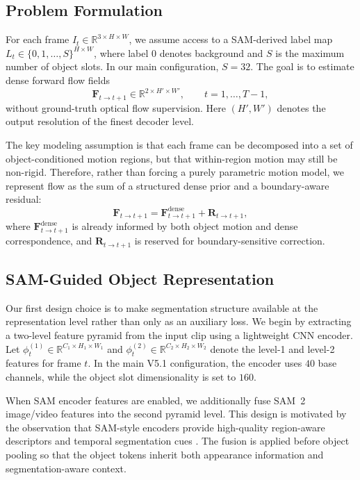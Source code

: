 \subsection{Problem Formulation}

For each frame $I_t \in \mathbb{R}^{3\times H\times W}$, we assume access to a SAM-derived label map $L_t \in \{0,1,\dots,S\}^{H\times W}$, where label $0$ denotes background and $S$ is the maximum number of object slots. In our main configuration, $S=32$. The goal is to estimate dense forward flow fields
\begin{equation}
\mathbf{F}_{t\rightarrow t+1} \in \mathbb{R}^{2\times H'\times W'}, \qquad t=1,\dots,T-1,
\end{equation}
without ground-truth optical flow supervision. Here $(H',W')$ denotes the output resolution of the finest decoder level.

The key modeling assumption is that each frame can be decomposed into a set of object-conditioned motion regions, but that within-region motion may still be non-rigid. Therefore, rather than forcing a purely parametric motion model, we represent flow as the sum of a structured dense prior and a boundary-aware residual:
\begin{equation}
\label{eq:flow_decomposition}
\mathbf{F}_{t\rightarrow t+1} = \mathbf{F}^{\mathrm{dense}}_{t\rightarrow t+1} + \mathbf{R}_{t\rightarrow t+1},
\end{equation}
where $\mathbf{F}^{\mathrm{dense}}_{t\rightarrow t+1}$ is already informed by both object motion and dense correspondence, and $\mathbf{R}_{t\rightarrow t+1}$ is reserved for boundary-sensitive correction.

\subsection{SAM-Guided Object Representation}

Our first design choice is to make segmentation structure available at the representation level rather than only as an auxiliary loss. We begin by extracting a two-level feature pyramid from the input clip using a lightweight CNN encoder. Let $\phi_t^{(1)} \in \mathbb{R}^{C_1\times H_1\times W_1}$ and $\phi_t^{(2)} \in \mathbb{R}^{C_2\times H_2\times W_2}$ denote the level-1 and level-2 features for frame $t$. In the main V5.1 configuration, the encoder uses $40$ base channels, while the object slot dimensionality is set to $160$.

When SAM encoder features are enabled, we additionally fuse SAM~2 image/video features into the second pyramid level. This design is motivated by the observation that SAM-style encoders provide high-quality region-aware descriptors and temporal segmentation cues \cite{kirillov2023segment,ravi2024sam2}. The fusion is applied before object pooling so that the object tokens inherit both appearance information and segmentation-aware context.

